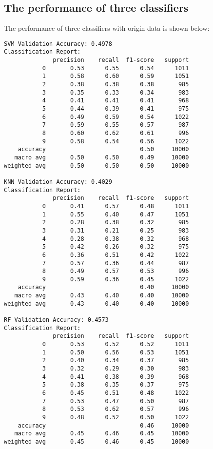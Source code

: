 \documentclass[a4paper,11pt]{article}
\begin{document}
\subsection{The performance of three classifiers}
The performance of three classifiers with origin data is shown below:
\begin{verbatim}
SVM Validation Accuracy: 0.4978
Classification Report:
              precision    recall  f1-score   support
           0       0.53      0.55      0.54      1011
           1       0.58      0.60      0.59      1051
           2       0.38      0.38      0.38       985
           3       0.35      0.33      0.34       983
           4       0.41      0.41      0.41       968
           5       0.44      0.39      0.41       975
           6       0.49      0.59      0.54      1022
           7       0.59      0.55      0.57       987
           8       0.60      0.62      0.61       996
           9       0.58      0.54      0.56      1022
    accuracy                           0.50     10000
   macro avg       0.50      0.50      0.49     10000
weighted avg       0.50      0.50      0.50     10000

KNN Validation Accuracy: 0.4029
Classification Report:
              precision    recall  f1-score   support
           0       0.41      0.57      0.48      1011
           1       0.55      0.40      0.47      1051
           2       0.28      0.38      0.32       985
           3       0.31      0.21      0.25       983
           4       0.28      0.38      0.32       968
           5       0.42      0.26      0.32       975
           6       0.36      0.51      0.42      1022
           7       0.57      0.36      0.44       987
           8       0.49      0.57      0.53       996
           9       0.59      0.36      0.45      1022
    accuracy                           0.40     10000
   macro avg       0.43      0.40      0.40     10000
weighted avg       0.43      0.40      0.40     10000

RF Validation Accuracy: 0.4573
Classification Report:
              precision    recall  f1-score   support
           0       0.53      0.52      0.52      1011
           1       0.50      0.56      0.53      1051
           2       0.40      0.34      0.37       985
           3       0.32      0.29      0.30       983
           4       0.41      0.38      0.39       968
           5       0.38      0.35      0.37       975
           6       0.45      0.51      0.48      1022
           7       0.53      0.47      0.50       987
           8       0.53      0.62      0.57       996
           9       0.48      0.52      0.50      1022
    accuracy                           0.46     10000
   macro avg       0.45      0.46      0.45     10000
weighted avg       0.45      0.46      0.45     10000
\end{verbatim}
\end{document}
